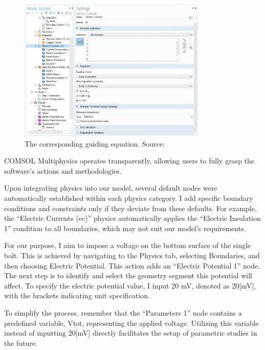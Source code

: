 \begin{figure}[H]
  \centering
  \includegraphics[width=0.8\textwidth]{Chapters/Figures/Chapter 3 Figures/Electrical Currents Physics Equation.png}
  \caption{The corresponding guiding equation. Source: \cite{multiphysics__modeling_nodate}}
  \label{fig:the guiding equation}
\end{figure}

COMSOL Multiphysics operates transparently, allowing users to fully grasp the software's actions and methodologies.

Upon integrating physics into our model, several default nodes were automatically established within each physics category. I add specific boundary conditions and constraints only if they deviate from these defaults. For example, the ``Electric Currents (ec)'' physics automatically applies the ``Electric Insulation 1'' condition to all boundaries, which may not suit our model's requirements.

For our purpose, I aim to impose a voltage on the bottom surface of the single bolt. This is achieved by navigating to the Physics tab, selecting Boundaries, and then choosing Electric Potential. This action adds an ``Electric Potential 1'' node. The next step is to identify and select the geometry segment this potential will affect. To specify the electric potential value, I input 20 mV, denoted as 20[mV], with the brackets indicating unit specification.

To simplify the process, remember that the ``Parameters 1'' node contains a predefined variable, Vtot, representing the applied voltage. Utilizing this variable instead of inputting 20[mV] directly facilitates the setup of parametric studies in the future.

